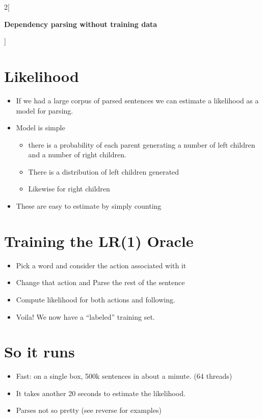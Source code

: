 \documentclass[12pt]{extarticle}
\begin{document}
\begin{multicols*}{2}[
\centerline{\Huge\bf Dependency parsing without training data}
\vspace{2ex}
]
\section*{Likelihood}
\begin{itemize}
\item If we had a large corpus of parsed sentences we can estimate a
likelihood as a model for parsing.
\item Model is simple
\begin{itemize}
\item  there is a probability of each parent
generating a number of left children and a number of right children.
\item There is a distribution of left children generated
\item Likewise for right children
\end{itemize}
\item These are easy to estimate by simply counting
\end{itemize}

\section*{Training the LR(1) Oracle}
\begin{itemize}
\item Pick a word and consider the action associated with it
\item Change that action and Parse the rest of the sentence
\item Compute likelihood for both actions and following.
\item Voila!  We now have a ``labeled'' training set.
\end{itemize}

\section*{So it runs}
\begin{itemize}
\item Fast: on a single box, 500k sentences in about a minute. (64 threads)
\item It takes another 20 seconds to estimate the likelihood.
\item Parses not so pretty (see reverse for examples)
\end{itemize}


\end{multicols*}
\end{document}
